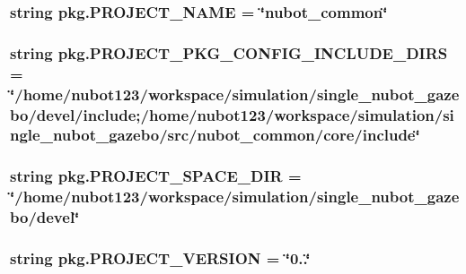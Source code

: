 \hypertarget{namespacepkg_a7dfbe99257c26f5e4a3a5483995d9ddc}{
\subsubsection[{P\-R\-O\-J\-E\-C\-T\-\_\-\-N\-A\-M\-E}]{\setlength{\rightskip}{0pt plus 5cm}string pkg.\-P\-R\-O\-J\-E\-C\-T\-\_\-\-N\-A\-M\-E = \char`\"{}nubot\-\_\-common\char`\"{}}}\label{namespacepkg_a7dfbe99257c26f5e4a3a5483995d9ddc}
\hypertarget{namespacepkg_a2760bf8266ff58da440f65ee91b203ab}{
\subsubsection[{P\-R\-O\-J\-E\-C\-T\-\_\-\-P\-K\-G\-\_\-\-C\-O\-N\-F\-I\-G\-\_\-\-I\-N\-C\-L\-U\-D\-E\-\_\-\-D\-I\-R\-S}]{\setlength{\rightskip}{0pt plus 5cm}string pkg.\-P\-R\-O\-J\-E\-C\-T\-\_\-\-P\-K\-G\-\_\-\-C\-O\-N\-F\-I\-G\-\_\-\-I\-N\-C\-L\-U\-D\-E\-\_\-\-D\-I\-R\-S = \char`\"{}/home/nubot123/workspace/simulation/single\-\_\-nubot\-\_\-gazebo/devel/include;/home/nubot123/workspace/simulation/single\-\_\-nubot\-\_\-gazebo/src/nubot\-\_\-common/core/include\char`\"{}}}\label{namespacepkg_a2760bf8266ff58da440f65ee91b203ab}
\hypertarget{namespacepkg_a3f0f1b4bc03c596525e025539ca4332f}{
\subsubsection[{P\-R\-O\-J\-E\-C\-T\-\_\-\-S\-P\-A\-C\-E\-\_\-\-D\-I\-R}]{\setlength{\rightskip}{0pt plus 5cm}string pkg.\-P\-R\-O\-J\-E\-C\-T\-\_\-\-S\-P\-A\-C\-E\-\_\-\-D\-I\-R = \char`\"{}/home/nubot123/workspace/simulation/single\-\_\-nubot\-\_\-gazebo/devel\char`\"{}}}\label{namespacepkg_a3f0f1b4bc03c596525e025539ca4332f}
\hypertarget{namespacepkg_ab1037914b9286bb61855131c06149648}{
\subsubsection[{P\-R\-O\-J\-E\-C\-T\-\_\-\-V\-E\-R\-S\-I\-O\-N}]{\setlength{\rightskip}{0pt plus 5cm}string pkg.\-P\-R\-O\-J\-E\-C\-T\-\_\-\-V\-E\-R\-S\-I\-O\-N = \char`\"{}0..\char`\"{}}}\label{namespacepkg_ab1037914b9286bb61855131c06149648}
